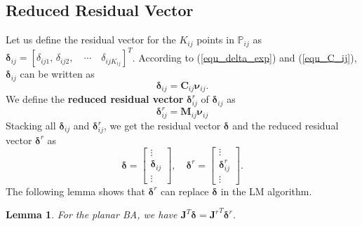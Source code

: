 \documentclass{vgtc}                          %
\newtheorem{lemma}{Lemma}
\begin{document}
\subsection{Reduced Residual  Vector }
Let us define the  residual vector for the $K_{ij}$ points in $\mathbb{P}_{ij}$ as $\bm{\delta}_{ij} = \left[\delta_{ij1}, \, \delta_{ij2}, \quad \cdots \quad \delta_{ijK_{ij}} \right]^{T}$. According to (\ref{equ_delta_exp}) and (\ref{equ_C_ij}), $\bm{\delta}_{ij}$ can be written as
\begin{equation} \label{equ_delta_ij}
\bm{\delta}_{ij} =	\mathbf{C}_{ij}\bm{\nu}_{ij}.
\end{equation}
We define the \textbf{ reduced residual vector} $\bm{\delta}_{ij}^{r}$  of $\bm{\delta}_{ij}$ as
\begin{equation} \label{equ_red_delta_ij}
\bm{\delta}_{ij}^{r} =	\mathbf{M}_{ij}\bm{\nu}_{ij}
\end{equation}
 Stacking   all $\bm{\delta}_{ij}$ and $\bm{\delta}_{ij}^{r}$, we get the  residual vector $\bm{\delta}$  and the reduced residual vector $\bm{\delta}^{r}$  as %
\begin{equation} \label{equ_delta_deltar}
	\bm{\delta} = \begin{bmatrix}
		\vdots \\
		\bm{\delta}_{ij} \\
		\vdots
	\end{bmatrix}, \quad
	\bm{\delta}^{r} = \begin{bmatrix}
		\vdots \\
		\bm{\delta}_{ij}^{r} \\
		\vdots
	\end{bmatrix}.
\end{equation}
The following lemma shows that  $	\bm{\delta}^{r} $ can replace 	$\bm{\delta}$ in the  LM algorithm.
\begin{lemma} \label{lemma_J_delta}
	 For the planar BA, we have $\mathbf{J}^{T}\bm{\delta} = {\mathbf{J}^r}^{T}\bm{\delta}^{r} $. 
\end{lemma}
\end{document}
